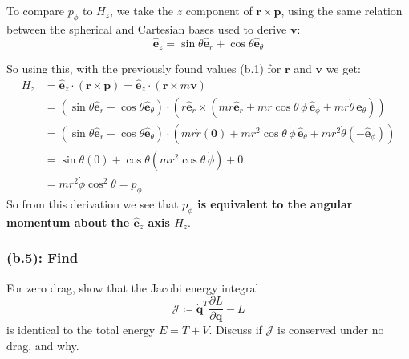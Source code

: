 \documentclass[titlepage]{article}
\begin{document}
To compare $p_\phi$ to $H_z$, we take the $z$ component of $\boldsymbol{r}\times\boldsymbol{p}$, using the same relation between the spherical and Cartesian bases used to derive $\boldsymbol{v}$:
\begin{equation}
	\hat{\boldsymbol{e}}_z=\sin\theta\hat{\boldsymbol{e}}_r+\cos\theta\hat{\boldsymbol{e}}_\theta
\end{equation}

\begin{mdframed}[linewidth=1pt, innertopmargin=10pt, innerbottommargin=10pt]
	So using this, with the previously found values (b.1) for $\boldsymbol{r}$ and $\boldsymbol{v}$ we get:
	\begin{equation}
		\begin{split}
			H_z&=\hat{\boldsymbol{e}}_z\cdot(\boldsymbol{r}\times\boldsymbol{p})=\hat{\boldsymbol{e}}_z\cdot(\boldsymbol{r}\times m\boldsymbol{v}) \\
			&=(\sin\theta\hat{\boldsymbol{e}}_r+\cos\theta\hat{\boldsymbol{e}}_\theta)\cdot(r\hat{\boldsymbol{e}}_r\times(m\dot{r}\hat{\boldsymbol{e}}_r+mr\cos\theta\,\dot{\phi}\,\hat{\boldsymbol{e}}_\phi+mr\dot{\theta}\,\hat{\boldsymbol{e}}_\theta)) \\
			&=(\sin\theta\hat{\boldsymbol{e}}_r+\cos\theta\hat{\boldsymbol{e}}_\theta)\cdot(mr\dot{r}(\boldsymbol{0})+mr^2\cos\theta\,\dot{\phi}\,\hat{\boldsymbol{e}}_\theta+mr^2\dot{\theta}(-\hat{\boldsymbol{e}}_\phi)) \\
			&=\sin\theta(0)+\cos\theta\left(mr^2\cos\theta\,\dot{\phi}\right)+0 \\
			&=mr^2\dot{\phi}\cos^2\theta=p_\phi
		\end{split}
		\label{eq:zmomentum}
	\end{equation}
	So from this derivation we see that \textbf{$p_\phi$ is equivalent to the angular momentum about the $\hat{\boldsymbol{e}}_z$ axis $H_z$}.
\end{mdframed}

\subsubsection*{(b.5): Find}

For zero drag, show that the Jacobi energy integral
\begin{equation}
	\mathcal{J}\coloneqq\dot{\boldsymbol{q}}^T\frac{\partial L}{\partial\dot{\boldsymbol{q}}}-L
\end{equation}
is identical to the total energy $E=T+V$. Discuss if $\mathcal{J}$ is conserved under no drag, and why.\\
\end{document}
